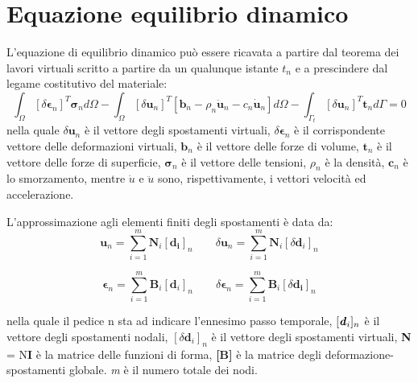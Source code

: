 \section{Equazione equilibrio dinamico}
L'equazione di equilibrio dinamico può essere ricavata a partire dal teorema dei lavori virtuali scritto a partire da un qualunque istante $t_n$ e a prescindere dal legame costitutivo del materiale: 
\begin{equation}
	\int_\varOmega [\delta\boldsymbol{\epsilon}_n]^T \boldsymbol{\sigma}_nd\varOmega - \int_\varOmega[\delta\boldsymbol{u}_n]^T[\boldsymbol{b}_n-\rho_n\boldsymbol{\ddot{u}}_n-c_n\boldsymbol{\dot{u}}_n]d\varOmega - 
	\int_{\varGamma_t}[\delta\boldsymbol{u}_n]^T \boldsymbol{t}_n d\varGamma=0
\end{equation}
nella quale $\delta\boldsymbol{u}_n$ è il vettore degli spostamenti virtuali, $\delta\boldsymbol{\epsilon}_n$ è il corrispondente vettore delle deformazioni virtuali, $\boldsymbol{b}_n$ è il vettore delle forze di volume, $\boldsymbol{t}_n$ è il vettore delle forze di superficie, $\boldsymbol{\sigma}_n$ è il vettore delle tensioni, $\rho_n$ è la densità,  $\boldsymbol{c}_n$ è lo smorzamento, mentre $\dot{u}$ e $\ddot{u}$ sono, rispettivamente, i vettori velocità ed accelerazione.

L'approssimazione agli elementi finiti degli spostamenti è data da:
\begin{equation}
	\boldsymbol{u}_n = \sum_{i=1}^m \boldsymbol{N}_i[\boldsymbol{d_i}]_n  \qquad
	\delta \boldsymbol{u}_n = \sum_{i=1}^m \boldsymbol{N}_i[\delta \boldsymbol{d}_i]_n
\end{equation}

\begin{equation}
	\boldsymbol{\epsilon}_n = \sum_{i=1}^m \boldsymbol{B}_i[\boldsymbol{d}_i]_n \qquad
	\delta\boldsymbol{\epsilon}_n = \sum_{i=1}^m \boldsymbol{B}_i[\delta\boldsymbol{d_i}]_n
\end{equation}

nella quale il pedice n sta ad indicare l'ennesimo passo temporale, $[\textbf{\textit{d}}_i]_n$ è il vettore degli spostamenti nodali, $[\delta\boldsymbol{d}_i]_n$ è il vettore degli spostamenti virtuali, \textbf{N} = N\textbf{I} è la matrice delle funzioni di forma, \textbf{[B]} è la matrice degli deformazione-spostamenti globale. \textit{m} è il numero totale dei nodi.

